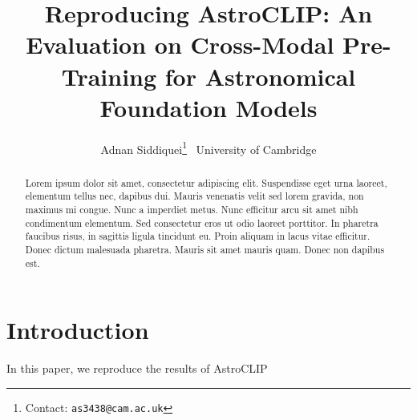 \documentclass{article} %
\title{Reproducing AstroCLIP: An Evaluation on Cross-Modal Pre-Training for Astronomical Foundation Models}
\author{Adnan Siddiquei\thanks{Contact: \texttt{as3438@cam.ac.uk}}$\;^{\:}$
   \vspace{15pt}
   \AND
    \textnormal{University of Cambridge} \vspace{10pt}
   \AND
 \vspace{10pt}
}
\begin{document}
    \maketitle

    \begin{abstract}
    Lorem ipsum dolor sit amet, consectetur adipiscing elit. Suspendisse eget urna laoreet, elementum tellus nec, dapibus dui.
    Mauris venenatis velit sed lorem gravida, non maximus mi congue. Nunc a imperdiet metus. Nunc efficitur arcu sit amet nibh
    condimentum elementum. Sed consectetur eros ut odio laoreet porttitor. In pharetra faucibus risus, in sagittis ligula
    tincidunt eu. Proin aliquam in lacus vitae efficitur. Donec dictum malesuada pharetra. Mauris sit amet mauris quam.
    Donec non dapibus est.
    \end{abstract}

    \section{Introduction}
    In this paper, we reproduce the results of AstroCLIP~\citep{astroclip}

    \nocite{*}
    
    
    \clearpage
\end{document}
